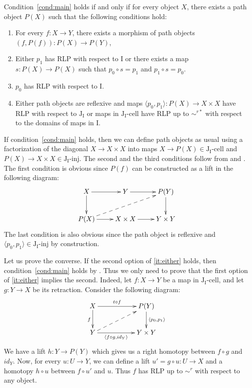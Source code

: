 \documentclass{tac}
\theoremstyle{definition}
\newcommand{\I}{\mathrm{I}}
\newcommand{\J}{\mathrm{J}}
\newcommand{\class}[2]{#1\text{-}\mathrm{#2}}
\newcommand{\Iinj}[1][\I]{\class{#1}{inj}}
\newcommand{\Icell}[1][\I]{\class{#1}{cell}}
\newcommand{\Jinj}[1][]{\Iinj[\J#1]}
\newcommand{\Jcell}[1][]{\Icell[\J#1]}
\begin{document}
\begin{prop}
Condition~\eqref{cond:main} holds if and only if for every object $X$,
there exists a path object $P(X)$ such that the following conditions hold:
\begin{enumerate}
\item For every $f : X \to Y$, there exists a morphism of path objects $(f,P(f)) : P(X) \to P(Y)$,
\item Either $p_1$ has RLP with respect to $\I$ or there exists a map $s : P(X) \to P(X)$ such that $p_0 \circ s = p_1$ and $p_1 \circ s = p_0$.
\item $p_0$ has RLP with respect to $\I$.
\item \label{it:either} Either path objects are reflexive and maps $\langle p_0, p_1 \rangle : P(X) \to X \times X$ have RLP with respect to $\J_\I$
or maps in $\Jcell[_\I]$ have RLP up to $\sim^{r*}$ with respect to the domains of maps in $\I$.
\end{enumerate}
\end{prop}
\proof
If condition~\eqref{cond:main} holds, then we can define path objects as usual using a factorization
of the diagonal $X \to X \times X$ into maps $X \to P(X) \in \Jcell[_\I]$ and $P(X) \to X \times X \in \Jinj[_\I]$.
The second and the third conditions follow from  and .
The first condition is obvious since $P(f)$ can be constructed as a lift in the following diagram:
\[ \xymatrix{ X \ar[r] \ar[d]            & Y \ar[r]          & P(Y) \ar[d] \\
              P(X) \ar[r] \ar@{-->}[urr] & X \times X \ar[r] & Y \times Y
            } \]
The last condition is also obvious since the path object is reflexive and $\langle p_0, p_1 \rangle \in \Jinj[_\I]$ by construction.

Let us prove the converse.
If the second option of \eqref{it:either} holds, then condition~\eqref{cond:main} holds by .
Thus we only need to prove that the first option of \eqref{it:either} implies the second.
Indeed, let $f : X \to Y$ be a map in $\Jcell[_\I]$, and let $g : Y \to X$ be its retraction.
Consider the following diagram:
\[ \xymatrix{ X \ar[rr]^-{t \circ f} \ar[d]_f & & P(Y) \ar[d]^{\langle p_0, p_1 \rangle} \\
              Y \ar[rr]_-{\langle f \circ g, id_Y \rangle} \ar@{-->}[urr] & & Y \times Y
            } \]
We have a lift $h : Y \to P(Y)$ which gives us a right homotopy between $f \circ g$ and $id_Y$.
Now, for every $u : U \to Y$, we can define a lift $u' = g \circ u : U \to X$ and a homotopy $h \circ u$ between $f \circ u'$ and $u$.
Thus $f$ has RLP up to $\sim^r$ with respect to any object.
\endproof
\end{document}
